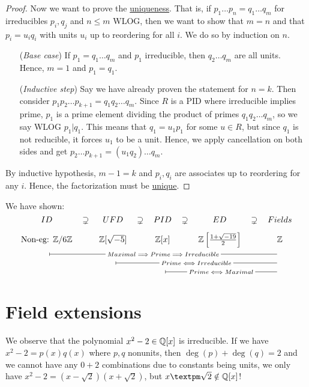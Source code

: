 \documentclass[12pt]{article}
\begin{document}
\begin{proof}
Now we want to prove the \uline{uniqueness}. That is, if $p_1\dots p_n = q_1\dots q_m$ for irreducibles $p_i,q_j$ and $n\leq m$ WLOG, then we want to show that $m=n$ and that $p_i=u_iq_i$ with units $u_i$ up to reordering for all $i$. We do so by induction on $n$.
\begin{itemize}[align=left]
    \item[(\textit{Base case})] If $p_1=q_1\dots q_m$ and $p_1$ irreducible, then $q_2\dots q_m$ are all units. Hence, $m=1$ and $p_1=q_1$.
    \item[(\textit{Inductive step})] Say we have already proven the statement for $n=k$. Then consider $p_1p_2\dots p_{k+1}=q_1q_2\dots q_m$. Since $R$ is a PID where irreducible implies prime, $p_1$ is a prime element dividing the product of primes $q_1q_2\dots q_m$, so we say WLOG $p_1|q_1$. This means that $q_1=u_1p_1$ for some $u\in R$, but since $q_1$ is not reducible, it forces $u_1$ to be a unit. Hence, we apply cancellation on both sides and get $p_2\dots p_{k+1}=(u_1q_2)\dots q_m$.
\end{itemize}
By inductive hypothesis, $m-1=k$ and $p_i, q_i$ are associates up to reordering for any $i$. Hence, the factorization must be \uline{unique}.
\end{proof}

\spl
\begin{tcolorbox}
    We have shown:
    \[\begin{tikzcd}[ampersand replacement=\&,cramped,sep=tiny]
        ID \& \supsetneq \& UFD \& \supsetneq \& PID \& \supsetneq \& ED \& \supsetneq \& Fields \\
        {\text{Non-eg: }\mathbb{Z}/6\mathbb{Z}} \&\& {\mathbb{Z}[\sqrt{-5}]} \&\& {\mathbb{Z}[x]} \&\& {\mathbb{Z}\left[\frac{1+\sqrt{-19}}{2}\right]} \&\& {\mathbb{Z}} \\
        {} \&\&\&\&\&\&\&\& {} \\
        \&\& {} \&\&\&\&\&\& {} \\
        \&\&\&\& {} \&\&\&\& {}
        \arrow["{Maximal\implies Prime\implies Irreducible}"{description}, maps to, no head, from=3-1, to=3-9]
        \arrow["{Prime \iff Irreducible}"{description}, maps to, no head, from=4-3, to=4-9]
        \arrow["{Prime\iff Maximal}"{description}, maps to, no head, from=5-5, to=5-9]
    \end{tikzcd}\]
\end{tcolorbox}
\spl

\section{Field extensions}
We observe that the polynomial $x^2-2\in \mathbb{Q} [x]$ is irreducible. If we have $x^2-2=p(x)q(x)$ where $p,q$ nonunits, then $\deg(p)+\deg(q)=2$ and we cannot have any $0+2$ combinations due to constants being units, we only have $x^2-2=(x-\sqrt{2})(x+\sqrt{2})$, but $x±\sqrt{2}\notin \Q[x]$!
\end{document}
